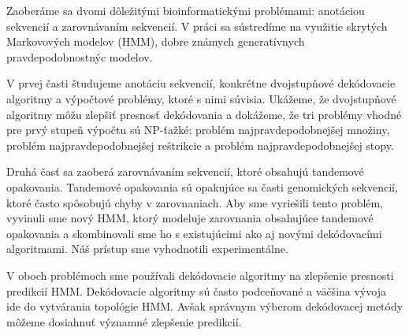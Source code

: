 Zaoberáme sa dvomi dôležitými bioinformatickými problémami: anotáciou sekvencií
a zarovnávaním sekvencií. V práci sa sústredíme na využitie skrytých Markovových modelov (HMM),
dobre známych generatívnych pravdepodobnostnýc modelov.

V prvej časti študujeme anotáciu sekvencií, konkrétne dvojstupňové dekódovacie algoritmy a
výpočtové problémy, ktoré s nimi súvisia. Ukážeme, že dvojstupňové algoritmy
môžu zlepšiť presnosť dekódovania a dokážeme, že tri problémy vhodné pre prvý stupeň výpočtu sú NP-ťažké:
problém najpravdepodobnejšej množiny,
problém najpravdepodobnejšej reštrikcie a problém najpravdepodobnejšej stopy.

Druhá časť sa zaoberá zarovnávaním sekvencií, ktoré obsahujú tandemové
opakovania. Tandemové opakovania sú  opakujúce sa časti genomických sekvencií,
ktoré často spôsobujú chyby v zarovnaniach. Aby sme vyriešili tento problém, vyvinuli
sme nový HMM, ktorý modeluje zarovnania obsahujúce tandemové opakovania a
skombinovali sme ho s existujúcimi ako aj novými dekódovacími algoritmami. Náš
prístup sme vyhodnotili experimentálne.

V oboch problémoch sme používali dekódovacie algoritmy na zlepšenie presnosti
predikcií HMM. Dekódovacie algoritmy sú často podceňované  a väčšina vývoja
ide do vytvárania topológie HMM. Avšak správnym výberom dekódovacej metódy môžeme
dosiahnuť významné zlepšenie predikcií.
